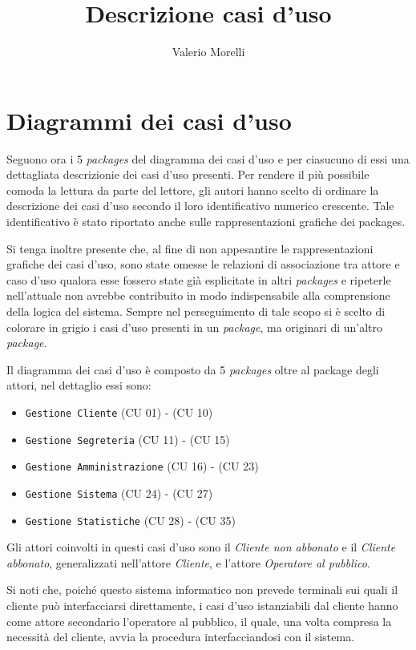 \documentclass{article}
\title{Descrizione casi d'uso}
\author{Valerio Morelli}
\begin{document}
\section{Diagrammi dei casi d'uso}

Seguono ora i 5 \emph{packages} del diagramma dei casi d'uso e per ciasucuno di essi una dettagliata descrizionie dei casi d'uso presenti. Per rendere il più possibile comoda la lettura da parte del lettore, gli autori hanno scelto di ordinare la descrizione dei casi d'uso secondo il loro identificativo numerico crescente. Tale identificativo è stato riportato anche sulle rappresentazioni grafiche dei packages. 

\medskip

Si tenga inoltre presente che, al fine di non appesantire le rappresentazioni grafiche dei casi d'uso, sono state omesse le relazioni di associazione tra attore e caso d'uso qualora esse fossero state già esplicitate in altri \emph{packages} e ripeterle nell'attuale non avrebbe contribuito in modo indispensabile alla comprensione della logica del sistema. Sempre nel perseguimento di tale scopo si è scelto di colorare in grigio i casi d'uso presenti in un \emph{package}, ma originari di un'altro \emph{package}.

\medskip

 Il diagramma dei casi d'uso è composto da 5 \emph{packages} oltre al package degli attori, nel dettaglio essi sono:

\medskip
\begin{itemize}[itemsep=0pt]
  \item \texttt{Gestione Cliente} (CU 01) - (CU 10)
  \item \texttt{Gestione Segreteria} (CU 11) - (CU 15)
  \item \texttt{Gestione Amministrazione} (CU 16) - (CU 23)
  \item \texttt{Gestione Sistema} (CU 24) - (CU 27)
  \item \texttt{Gestione Statistiche} (CU 28) - (CU 35)
\end{itemize}

\medskip
Gli attori coinvolti in questi casi d'uso sono il \emph{Cliente non abbonato} e il \emph{Cliente abbonato}, generalizzati nell'attore \emph{Cliente}, e l'attore \emph{Operatore al pubblico}.

\medskip
Si noti che, poiché questo sistema informatico non prevede terminali sui quali il cliente può interfacciarsi direttamente, i casi d'uso istanziabili dal cliente hanno come attore secondario l'operatore al pubblico, il quale, una volta compresa la necessità del cliente, avvia la procedura interfacciandosi con il sistema.
\end{document}
